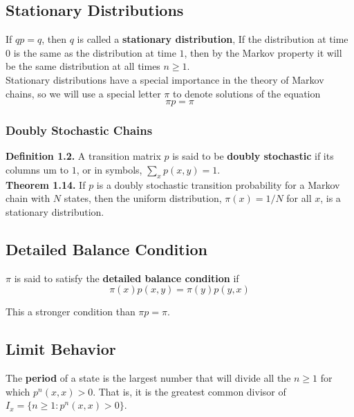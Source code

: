 \documentclass[12pt]{article}
\begin{document}
\subsection{Stationary Distributions}

If $qp = q$, then $q$ is called a \textbf{stationary distribution}, If the distribution at time $0$ is the same as the distribution at time $1$, then by the Markov property it will be the same distribution at all times $n \geq 1$.\\

Stationary distributions have a special importance in the theory of Markov chains, so we will use a special letter $\pi$ to denote solutions of the equation $$\pi p = \pi$$


\subsubsection{Doubly Stochastic Chains}

\textbf{Definition 1.2.} A transition matrix $p$ is said to be \textbf{doubly stochastic} if its columns um to $1$, or in symbols, $\sum_x p(x,y) = 1$.\\

\textbf{Theorem 1.14.} If $p$ is a doubly stochastic transition probability for a Markov chain with $N$ states, then the uniform distribution, $\pi(x) = 1/N$ for all $x$, is a stationary distribution.


\subsection{Detailed Balance Condition}

$\pi$ is said to satisfy the \textbf{detailed balance condition} if $$\pi(x) p(x, y) = \pi(y) p(y, x)$$

This a stronger condition than $\pi p = \pi$.


\subsection{Limit Behavior}

The \textbf{period} of a state is the largest number that will divide all the $n \geq 1$ for which $p^n(x, x) > 0$. That is, it is the greatest common divisor of $I_x = \{n \geq 1: p^n(x, x) > 0\}$.\\
\end{document}
